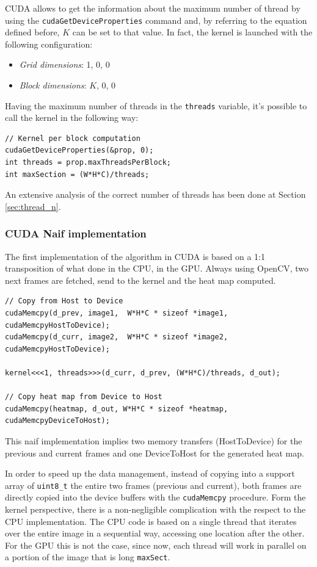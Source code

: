 \documentclass[paper=a4, fontsize=10pt]{scrartcl}	%
\begin{document}
	CUDA allows to get the information about the maximum number of thread by using the \texttt{cudaGetDeviceProperties} command and, by referring to the equation defined before, $K$ can be set to that value. In fact, the kernel is launched with the following configuration:
	\begin{itemize}
		\itemsep0sp
		\item \textit{Grid dimensions}:  1, 0, 0
		\item \textit{Block dimensions}: $K$, 0, 0
	\end{itemize}
	Having the maximum number of threads in the \texttt{threads} variable, it's possible to call the kernel in the following way:
	\begin{lstlisting}[style=CStyle]
// Kernel per block computation
cudaGetDeviceProperties(&prop, 0);
int threads = prop.maxThreadsPerBlock;
int maxSection = (W*H*C)/threads;\end{lstlisting}
	
	An extensive analysis of the correct number of threads has been done at Section \ref{sec:thread_n}.

	\subsubsection{CUDA Naif implementation}
	The first implementation of the algorithm in CUDA is based on a 1:1 transposition of what done in the CPU, in the GPU. Always using OpenCV, two next frames are fetched, send to the kernel and the heat map computed.
	
	\begin{lstlisting}[style=CStyle]
// Copy from Host to Device
cudaMemcpy(d_prev, image1,  W*H*C * sizeof *image1, cudaMemcpyHostToDevice);
cudaMemcpy(d_curr, image2,  W*H*C * sizeof *image2, cudaMemcpyHostToDevice);

kernel<<<1, threads>>>(d_curr, d_prev, (W*H*C)/threads, d_out);

// Copy heat map from Device to Host
cudaMemcpy(heatmap, d_out, W*H*C * sizeof *heatmap, cudaMemcpyDeviceToHost);\end{lstlisting}

	This naif implementation implies two memory transfers (HostToDevice) for the previous and current frames and one DeviceToHost for the generated heat map.
	
	
	In order to speed up the data management, instead of copying into a support array of \texttt{uint8\_t} the entire two frames (previous and current), both frames are directly copied into the device buffers with the \texttt{cudaMemcpy} procedure.\newline\newline
	Form the kernel perspective, there is a non-negligible complication with the respect to the CPU implementation. The CPU code is based on a single thread that iterates over the entire image in a sequential way, accessing one location after the other. For the GPU this is not the case, since now, each thread will work in parallel on a portion of the image that is long \texttt{maxSect}.
	
\end{document}
